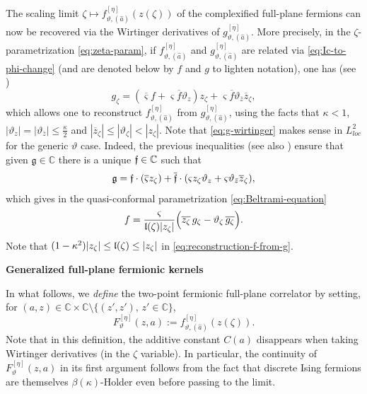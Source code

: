\documentclass[reqno]{amsart}
\numberwithin{equation}{section}
\theoremstyle{definition}
\theoremstyle{remark}
\begin{document}
\medskip

The scaling limit $\zeta\mapsto f^{[\eta]}_{\vartheta,(\hat{a})}(z(\zeta))$ of the complexified full-plane fermions can now be recovered via the Wirtinger derivatives of $g^{[\eta]}_{\vartheta,(\hat{a})}$. More precisely, in the $\zeta$-parametrization \eqref{eq:zeta-param}, if $f^{[\eta]}_{\vartheta,(\hat{a})}$ and $g^{[\eta]}_{\vartheta,(\hat{a})}$ are related via \eqref{eq:Ic-to-phi-change} (and are denoted below by $f$ and $g$ to lighten notation), one has (see \cite[Section~2.7]{Che20}) \begin{equation}\label{eq:g-wirtinger}
 g_\zeta= (\overline{\varsigma}f+\varsigma\overline{f}\vartheta_z)z_\zeta + \varsigma \overline{f} \vartheta_{\bar{z}} \overline{z}_\zeta, 
\end{equation}
which allows one to reconstruct $f^{[\eta]}_{\vartheta,(\hat{a})}$ from $g^{[\eta]}_{\vartheta,(\hat{a})}$, using the facts that $\kappa < 1$, $|\vartheta_{z}|= |\vartheta_{\bar{z}}|\leq \tfrac{\kappa}{2}$ and 
$|\overline{z}_\zeta| \leq |\vartheta_\zeta| < |z_\zeta|$. Note that \eqref{eq:g-wirtinger} makes sense in $ L^{2}_{loc}$ for the generic $\vartheta$ case. Indeed, the previous inequalities (see also \cite[Remark 2.22]{CLR2}) ensure that given $\mathfrak{g} \in \mathbb{C}$ there is a unique $ \frak{f} \in \mathbb{C}$ such that
\begin{equation}
	 \frak{g}= \frak{f}\cdot(\overline{\varsigma}z_\zeta) + \overline{\frak{f}} \cdot  (\varsigma z_\zeta \vartheta_z + \varsigma \vartheta_{\bar{z}} \overline{z}_\zeta),
\end{equation}
which gives in the quasi-conformal parametrization \eqref{eq:Beltrami-equation}
\begin{equation}\label{eq:reconstruction-f-from-g}
f
= \frac{\varsigma}{\frak{l}(\zeta)|z_\zeta|} \Big(\overline{z_\zeta}\,g_\zeta-
\vartheta_\zeta\,\overline{g_\zeta}\Big).
\end{equation}
Note that $(1-\kappa^2)|z_\zeta| \leq \frak{l}(\zeta) \leq |z_\zeta|$ in \eqref{eq:reconstruction-f-from-g}.

\textbf{Generalized full-plane fermionic kernels}

In what follows, we \emph{define} the two-point fermionic full-plane correlator by setting, for $(a, z) \in \mathbb{C} \times \mathbb{C} \setminus \{ (z', z'),\, z' \in \mathbb{C} \}$,
\begin{equation}\label{eq:full_continuous_2_points_correlator}
	 F^{[\eta]}_{\vartheta}(z,a):= f^{[\eta]}_{\vartheta,(\hat{a})}(z(\zeta)).
\end{equation}
Note that in this definition, the additive constant $C(a)$ disappears when taking Wirtinger derivatives (in the $\zeta$ variable). In particular, the continuity of $F^{[\eta]}_{\vartheta}(z,a)$ in its first argument follows from the fact that discrete Ising fermions are themselves $\beta(\kappa)$-Holder even before passing to the limit. 
\medskip
\end{document}

